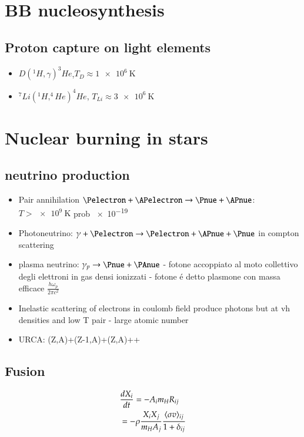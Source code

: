 \documentclass[main.tex]{subfiles}
\begin{document}
\chapter{BB nucleosynthesis}
\PartialToc

\section{Proton capture on light elements}

\begin{itemize}
\item $D(^1H,\gamma)^3He$,$T_D\approx \SI{1e6}{\kelvin}$
\item $^7Li(^1H,^4He)^4He$, $T_{Li}\approx\SI{3e6}{\kelvin}$ 

\end{itemize}

\chapter{Nuclear burning in stars}
\PartialToc

\section{neutrino production}
\begin{itemize}
\item  Pair annihilation $\Pelectron+\APelectron\to\Pnue+\APnue$: $T>\SI{e9}{\kelvin}$ prob \num{e-19}
\item Photoneutrino: $\gamma+\Pelectron\to\Pelectron+\APnue+\Pnue$ in compton scattering
\item plasma neutrino: $\gamma_p\to\Pnue+\PAnue$ - fotone accoppiato al moto collettivo degli elettroni in gas densi ionizzati - fotone \'e detto plasmone con massa efficace $\frac{h\omega_p}{2\pi c^2}$
\item Inelastic scattering of electrons in coulomb field produce photons but at vh densities and low T \Pnue\APnue pair - large atomic number
\item URCA: (Z,A)+\Pelectron\to(Z-1,A)+\Pnue\to(Z,A)+\Pelectron+\APelectron
\end{itemize}
\section{Fusion}
\begin{align*}
&\TDy{t}{X_i}=-A_im_HR_{ij}\\
&=-\rho\frac{X_iX_j}{m_HA_j}\frac{\exv{\sigma v}_{ij}}{1+\delta_{ij}}
\end{align*} 
\end{document}
